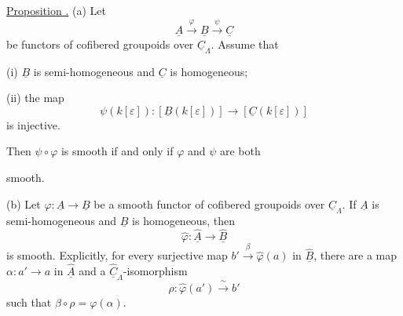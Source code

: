 \underline{Proposition .} (a) Let
\[
 \underline A\xrightarrow{\ \varphi\ }\underline B
 \xrightarrow{\ \psi\ }\underline C
\]
be functors of cofibered groupoids over $\underline C_\Lambda$.
Assume that

(i) $\underline B$ is semi-homogeneous and $\underline C$ is
homogeneous;

(ii) the map
\[
 \psi(k[\varepsilon]):[\underline B(k[\varepsilon])]
 \longrightarrow[\underline C(k[\varepsilon])]
\]
is injective.

Then $\psi\circ\varphi$ is smooth if and only if $\varphi$ and
$\psi$ are both


smooth.

(b) Let $\varphi:\underline A\longrightarrow\underline B$ be a
smooth functor of cofibered groupoids over $\underline C_\Lambda$.
If $\underline A$ is semi-homogeneous and $\underline B$ is
homogeneous, then
\[
 \widehat\varphi:\widehat{\underline A}
 \longrightarrow\widehat{\underline B}
\]
is smooth. Explicitly, for every surjective map
$b'\xrightarrow{\beta}\widehat\varphi(a)$ in
$\widehat{\underline B}$, there are a map
$\alpha:a'\longrightarrow a$ in $\widehat{\underline A}$ and a
$\widehat{\underline C}_\Lambda$-isomorphism
\[
 \rho:\widehat\varphi(a')\xrightarrow{\ \sim\ }b'
\]
such that $\beta\circ\rho=\varphi(\alpha)$.

